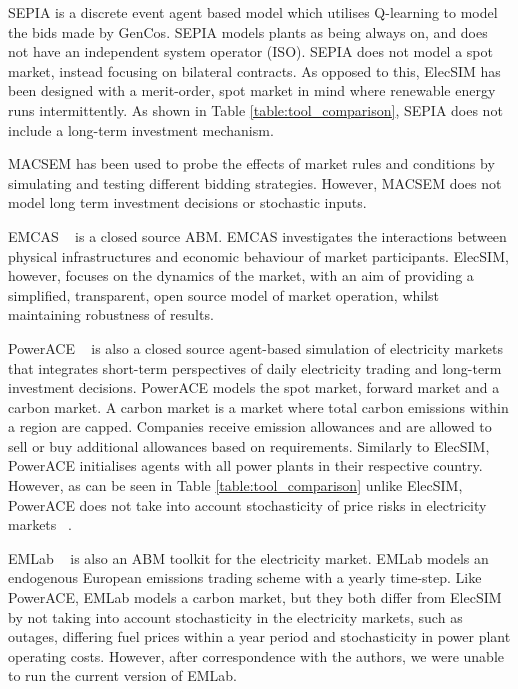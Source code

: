 SEPIA \cite{Harp2000} is a discrete event agent based model which utilises Q-learning to model the bids made by GenCos. SEPIA models plants as being always on, and does not have an independent system operator (ISO).  SEPIA does not model a spot market, instead focusing on bilateral contracts. As opposed to this, ElecSIM has been designed with a merit-order, spot market in mind where renewable energy runs intermittently. As shown in Table \ref{table:tool_comparison}, SEPIA does not include a long-term investment mechanism. 

MACSEM \cite{Praca2003} has been used to probe the effects of market rules and conditions by simulating and testing different bidding strategies. However, MACSEM does not model long term investment decisions or stochastic inputs.

EMCAS ~\cite{Conzelmann} is a closed source ABM. EMCAS investigates the interactions between physical infrastructures and economic behaviour of market participants. ElecSIM, however, focuses on the dynamics of the market, with an aim of providing a simplified, transparent, open source model of market operation, whilst maintaining robustness of results.

PowerACE ~\cite{Rothengatter2007} is also a closed source agent-based simulation of electricity markets that integrates short-term perspectives of daily electricity trading and long-term investment decisions. PowerACE models the spot market, forward market and a carbon market. A carbon market is a market where total carbon emissions within a region are capped. Companies receive emission allowances and are allowed to sell or buy additional allowances based on requirements. Similarly to ElecSIM, PowerACE initialises agents with all power plants in their respective country. However, as can be seen in Table \ref{table:tool_comparison} unlike ElecSIM, PowerACE does not take into account stochasticity of price risks in electricity markets ~\cite{Most2010}.

EMLab ~\cite{Chappin2017} is also an ABM toolkit for the electricity market. EMLab models an endogenous European emissions trading scheme with a yearly time-step. Like PowerACE, EMLab models a carbon market, but they both differ from ElecSIM by not taking into account stochasticity in the electricity markets, such as outages, differing fuel prices within a year period and stochasticity in power plant operating costs. However, after correspondence with the authors, we were unable to run the current version of EMLab.

